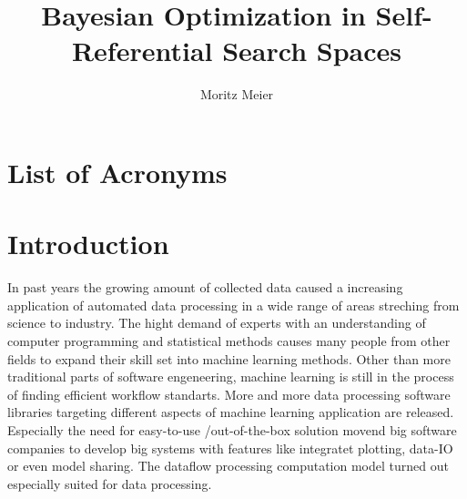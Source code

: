 \documentclass[english]{article}
\begin{document}
\title{Bayesian Optimization in Self-Referential Search Spaces}
\author{Moritz Meier}
\maketitle
\tableofcontents
\newpage

\section*{List of Acronyms}
\begin{acronym}
\end{acronym}

\section{Introduction}

In past years the growing amount of collected data caused a increasing application of automated data processing in a wide range of areas streching from  science to industry.
The hight demand of experts with an understanding of computer programming and statistical methods causes many people from other fields to expand their skill set into machine learning methods. Other than more traditional parts of software engeneering, machine learning is still in the process of finding efficient workflow standarts. More and more data processing software libraries targeting different aspects of machine learning application are released. Especially the need for easy-to-use /out-of-the-box solution movend big software companies to develop big systems with features like integratet plotting, data-IO or even model sharing. The dataflow processing computation model turned out especially suited for data processing.
\end{document}
